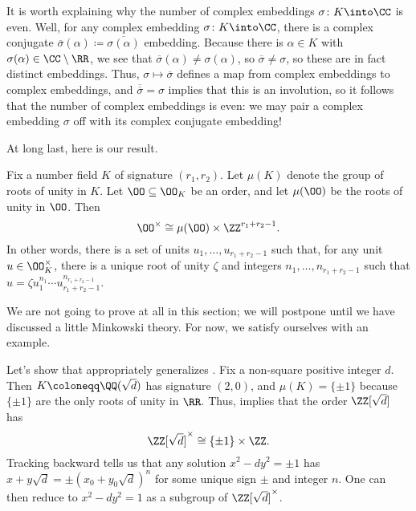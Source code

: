\documentclass[../notes.tex]{subfiles}
\begin{document}
\begin{remark} \label{rem:complex-conjugate-complex-embed}
	It is worth explaining why the number of complex embeddings $\sigma\colon K\into\CC$ is even. Well, for any complex embedding $\sigma\colon K\into\CC$, there is a complex conjugate $\overline\sigma(\alpha)\coloneqq\overline{\sigma(\alpha)}$ embedding. Because there is $\alpha\in K$ with $\sigma(\alpha)\in\CC\setminus\RR$, we see that $\overline\sigma(\alpha)\ne\sigma(\alpha)$, so $\overline\sigma\ne\sigma$, so these are in fact distinct embeddings. Thus, $\sigma\mapsto\overline\sigma$ defines a map from complex embeddings to complex embeddings, and $\overline{\overline\sigma}=\sigma$ implies that this is an involution, so it follows that the number of complex embeddings is even: we may pair a complex embedding $\sigma$ off with its complex conjugate embedding!
\end{remark}
At long last, here is our result.
\begin{theorem} \label{thm:dirichlet-unit}
	Fix a number field $K$ of signature $(r_1,r_2)$. Let $\mu(K)$ denote the group of roots of unity in $K$. Let $\OO\subseteq\OO_K$ be an order, and let $\mu(\OO)$ be the roots of unity in $\OO$. Then
	\[\OO^\times\cong\mu(\OO)\times\ZZ^{r_1+r_2-1}.\]
	In other words, there is a set of units $u_1,\ldots,u_{r_1+r_2-1}$ such that, for any unit $u\in\OO_K^\times$, there is a unique root of unity $\zeta$ and integers $n_1,\ldots,n_{r_1+r_2-1}$ such that $u=\zeta u_1^{n_1}\cdots u_{r_1+r_2-1}^{n_{r_1+r_2-1}}$.
\end{theorem}
We are not going to prove  at all in this section; we will postpone until we have discussed a little Minkowski theory. For now, we satisfy ourselves with an example.
\begin{example}
	Let's show that  appropriately generalizes . Fix a non-square positive integer $d$. Then $K\coloneqq\QQ(\sqrt d)$ has signature $(2,0)$, and $\mu(K)=\{\pm1\}$ because $\{\pm1\}$ are the only roots of unity in $\RR$. Thus,  implies that the order $\ZZ[\sqrt d]$ has
	\[\ZZ[\sqrt d]^\times\cong\{\pm1\}\times\ZZ.\]
	Tracking  backward tells us that any solution $x^2-dy^2=\pm1$ has $x+y\sqrt d=\pm\left(x_0+y_0\sqrt d\right)^n$ for some unique sign $\pm$ and integer $n$. One can then reduce to $x^2-dy^2=1$ as a subgroup of $\ZZ[\sqrt d]^\times$.
\end{example}
\end{document}
